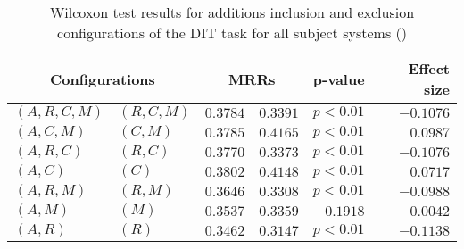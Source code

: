 
\begin{table}
\begin{spacing}{1.2}
\centering
\caption{Wilcoxon test results for additions inclusion and exclusion configurations of the DIT task for all subject systems (\ctwo)}
\label{table:versus-wilcox-all-dit-additions}
\begin{tabular}{ll|rr|rr}
\toprule
      \multicolumn{2}{c|}{Configurations} &                \multicolumn{2}{c|}{MRRs} &             p-value & Effect size \\
\midrule
 $(A,R,C,M)$ &  $(R,C,M)$ &  $\bm{0.3784}$ &       $0.3391$ & $p<0.01$ &   $-0.1076$ \\
   $(A,C,M)$ &    $(C,M)$ &       $0.3785$ &  $\bm{0.4165}$ & $p<0.01$ &    $0.0987$ \\
   $(A,R,C)$ &    $(R,C)$ &  $\bm{0.3770}$ &       $0.3373$ & $p<0.01$ &   $-0.1076$ \\
     $(A,C)$ &      $(C)$ &       $0.3802$ &  $\bm{0.4148}$ & $p<0.01$ &    $0.0717$ \\
   $(A,R,M)$ &    $(R,M)$ &  $\bm{0.3646}$ &       $0.3308$ & $p<0.01$ &   $-0.0988$ \\
     $(A,M)$ &      $(M)$ &  $\bm{0.3537}$ &       $0.3359$ & $0.1918$ &    $0.0042$ \\
     $(A,R)$ &      $(R)$ &  $\bm{0.3462}$ &       $0.3147$ & $p<0.01$ &   $-0.1138$ \\
\bottomrule
\end{tabular}

\end{spacing}
\end{table}


